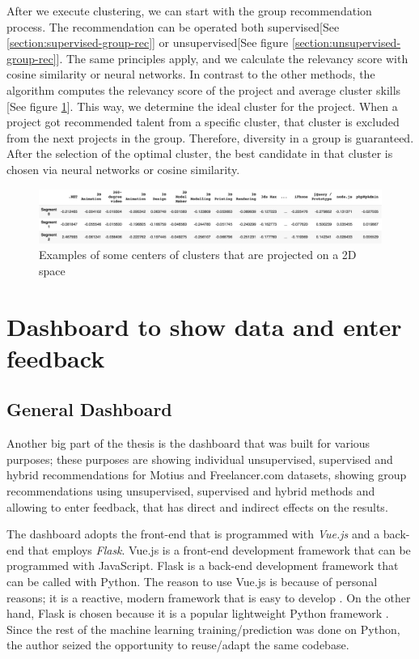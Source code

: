 After we execute clustering, we can start with the group recommendation process. The recommendation can be operated both supervised[See \ref{section:supervised-group-rec}] or unsupervised[See figure \ref{section:unsupervised-group-rec}]. The same principles apply, and we calculate the relevancy score with cosine similarity or neural networks. In contrast to the other methods, the algorithm computes the relevancy score of the project and average cluster skills [See figure \ref{fig:cluster-centers-matrix}]. This way, we determine the ideal cluster for the project. When a project got recommended talent from a specific cluster, that cluster is excluded from the next projects in the group. Therefore, diversity in a group is guaranteed. After the selection of the optimal cluster, the best candidate in that cluster is chosen via neural networks or cosine similarity.

\begin{figure}[htp]
	\centering
	\includegraphics[width=\textwidth]{figures/ClusterCentersMatrix.png}
	\caption{Examples of some centers of clusters that are projected on a 2D space}
	\label{fig:cluster-centers-matrix}
\end{figure}



\section{Dashboard to show data and enter feedback}

\subsection{General Dashboard}

Another big part of the thesis is the dashboard that was built for various purposes; these purposes are showing individual unsupervised, supervised and hybrid recommendations for Motius and Freelancer.com datasets, showing group recommendations using unsupervised, supervised and hybrid methods and allowing to enter feedback, that has direct and indirect effects on the results.

The dashboard adopts the front-end that is programmed with \textit{Vue.js} and a back-end that employs \textit{Flask}. Vue.js is a front-end development framework that can be programmed with JavaScript. Flask is a back-end development framework that can be called with Python. The reason to use Vue.js is because of personal reasons; it is a reactive, modern framework that is easy to develop \cite{you2018vue}. On the other hand, Flask is chosen because it is a popular lightweight Python framework \cite{grinberg2018flask}. Since the rest of the machine learning training/prediction was done on Python, the author seized the opportunity to reuse/adapt the same codebase. 

